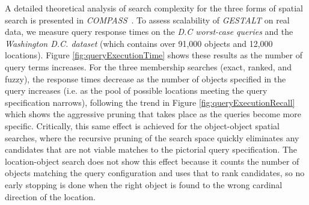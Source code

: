 



A detailed theoretical analysis of search complexity for the three forms of spatial search is presented in \emph{COMPASS}~\cite{Osul2023}.
To assess scalability of \emph{GESTALT} on real data, we measure query response times on the \textit{D.C worst-case queries} and the \textit{Washington D.C. dataset} (which contains over 91,000 objects and 12,000 locations).
Figure \ref{fig:queryExecutionTime} shows these results as the number of query terms increases. 
For the three membership searches (exact, ranked, and fuzzy), the response times decrease as the number of objects specified in the query increases (i.e. as the pool of possible locations meeting the query specification narrows), following the trend in Figure \ref{fig:queryExecutionRecall} which shows the aggressive pruning that takes place as the queries become more specific.
Critically, this same effect is achieved for the object-object spatial searches, where the recursive pruning of the search space quickly eliminates any candidates that are not viable matches to the pictorial query specification.
The location-object search does not show this effect because it counts the number of objects matching the query configuration and uses that to rank candidates, so no early stopping is done when the right object is found to the wrong cardinal direction of the location. %









